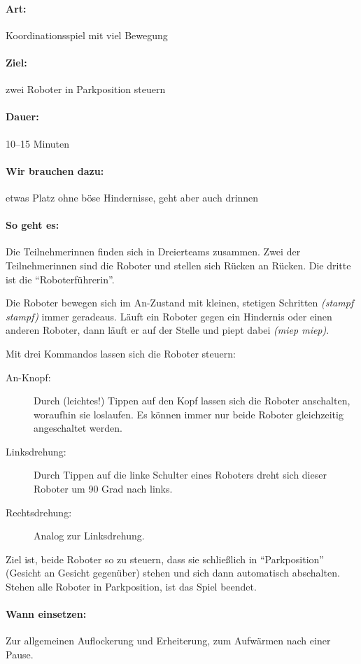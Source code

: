 \paragraph{Art:} Koordinationsspiel mit viel Bewegung
\paragraph{Ziel:} zwei Roboter in Parkposition steuern
\paragraph{Dauer:} 10--15 Minuten
\paragraph{Wir brauchen dazu:} etwas Platz ohne böse Hindernisse, geht aber auch drinnen
\paragraph{So geht es:} Die Teilnehmerinnen finden sich in Dreierteams zusammen. Zwei der Teilnehmerinnen sind die Roboter und stellen sich Rücken an Rücken. Die dritte ist die "`Roboterführerin"'.

Die Roboter bewegen sich im An-Zustand mit kleinen, stetigen Schritten \emph{(stampf stampf)} immer geradeaus. Läuft ein Roboter gegen ein Hindernis oder einen anderen Roboter, dann läuft er auf der Stelle und piept dabei \emph{(miep miep)}.

Mit drei Kommandos lassen sich die Roboter steuern:
\begin{description}
  \item[An-Knopf:] Durch (leichtes!) Tippen auf den Kopf lassen sich die Roboter anschalten, woraufhin sie loslaufen. Es können immer nur beide Roboter gleichzeitig angeschaltet werden.
  \item[Linksdrehung:] Durch Tippen auf die linke Schulter eines Roboters dreht sich dieser Roboter um 90 Grad nach links.
  \item[Rechtsdrehung:] Analog zur Linksdrehung.
\end{description}
Ziel ist, beide Roboter so zu steuern, dass sie schließlich in "`Parkposition"' (Gesicht an Gesicht gegenüber) stehen und sich dann automatisch abschalten. Stehen alle Roboter in Parkposition, ist das Spiel beendet.
\paragraph{Wann einsetzen:} Zur allgemeinen Auflockerung und Erheiterung, zum Aufwärmen nach einer Pause.
